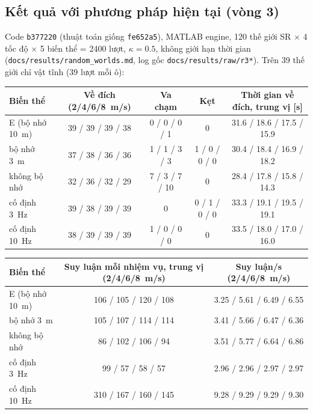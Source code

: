 \documentclass[11pt,a4paper]{article}
\numberwithin{equation}{section}
\newcommand{\code}[1]{\texttt{\small #1}}
\theoremstyle{definition}
\theoremstyle{plain}
\theoremstyle{remark}
\begin{document}
\subsection{Kết quả với phương pháp hiện tại (vòng 3)}
\label{sec:results}
Code \code{b377220} (thuật toán giống \code{fe652a5}), MATLAB engine, 120 thế giới SR $\times$ 4 tốc độ $\times$ 5 biến thể = 2400 lượt, $\kappa=0.5$, không giới hạn thời gian (\code{docs/results/random\_worlds.md}, log gốc \code{docs/results/raw/r3*}). Trên 39 thế giới chỉ vật tĩnh (39 lượt mỗi ô):
\begin{center}\footnotesize
\begin{tabular}{@{}lcccc@{}}
\toprule
Biến thể & Về đích (2/4/6/8~m/s) & Va chạm & Kẹt & Thời gian về đích, trung vị [s] \\ \midrule
E (bộ nhớ 10~m) & 39 / 39 / 39 / 38 & 0 / 0 / 0 / 1 & 0 & 31.6 / 18.6 / 17.5 / 15.9 \\
bộ nhớ 3~m & 37 / 38 / 36 / 36 & 1 / 1 / 3 / 3 & 1 / 0 / 0 / 0 & 30.4 / 18.4 / 16.9 / 18.2 \\
không bộ nhớ & 32 / 36 / 32 / 29 & 7 / 3 / 7 / 10 & 0 & 28.4 / 17.8 / 15.8 / 14.3 \\
cố định 3~Hz & 39 / 38 / 39 / 39 & 0 & 0 / 1 / 0 / 0 & 33.3 / 19.1 / 19.5 / 19.1 \\
cố định 10~Hz & 38 / 39 / 39 / 39 & 1 / 0 / 0 / 0 & 0 & 33.5 / 18.0 / 17.0 / 16.0 \\
\bottomrule
\end{tabular}

\medskip
\begin{tabular}{@{}lcc@{}}
\toprule
Biến thể & Suy luận mỗi nhiệm vụ, trung vị (2/4/6/8~m/s) & Suy luận/s (2/4/6/8~m/s) \\ \midrule
E (bộ nhớ 10~m) & 106 / 105 / 120 / 108 & 3.25 / 5.61 / 6.49 / 6.55 \\
bộ nhớ 3~m & 105 / 107 / 114 / 114 & 3.41 / 5.66 / 6.47 / 6.36 \\
không bộ nhớ & 86 / 102 / 106 / 94 & 3.51 / 5.77 / 6.64 / 6.86 \\
cố định 3~Hz & 99 / 57 / 58 / 57 & 2.96 / 2.96 / 2.97 / 2.97 \\
cố định 10~Hz & 310 / 167 / 160 / 145 & 9.28 / 9.29 / 9.29 / 9.30 \\
\bottomrule
\end{tabular}
\end{center}
\end{document}
